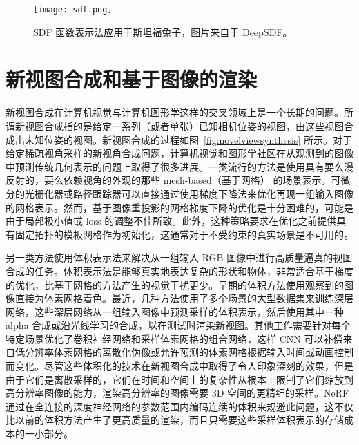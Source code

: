 \begin{figure}[t]
  \centering
  \texttt{[image: sdf.png]}
  \caption{SDF 函数表示法应用于斯坦福兔子，图片来自于 DeepSDF\cite{park2019deepsdf}。}
  \label{fig:sdf}
\end{figure}

\section{新视图合成和基于图像的渲染}
新视图合成在计算机视觉与计算机图形学这样的交叉领域上是一个长期的问题。所谓新视图合成指的是给定一系列（或者单张）已知相机位姿的视图，由这些视图合成出未知位姿的视图。新视图合成的过程如图~\ref{fig:novelviewsynthesis} 所示。对于给定稀疏视角采样的新视角合成问题，计算机视觉和图形学社区在从观测到的图像中预测传统几何表示的问题上取得了很多进展。一类流行的方法是使用具有要么漫反射\cite{Waechter2014Let}的，要么依赖视角\cite{debevec1996modeling, wood2000surface}的外观的那些 mesh-based（基于网格） 的场景表示。可微分的光栅化器\cite{loper2014opendr,chen2019learning,genova2018unsupervised,liu2019soft}或路径跟踪器\cite{li2018differentiable,nimier2019mitsuba}可以直接通过使用梯度下降法来优化再现一组输入图像的网格表示。然而，基于图像重投影的网格梯度下降的优化是十分困难的，可能是由于局部极小值或 loss 的调整不佳所致。此外，这种策略\cite{li2018differentiable}要求在优化之前提供具有固定拓扑的模板网格作为初始化，这通常对于不受约束的真实场景是不可用的。

另一类方法使用体积表示法来解决从一组输入 RGB 图像中进行高质量逼真的视图合成的任务。体积表示法是能够真实地表达复杂的形状和物体，非常适合基于梯度的优化，比基于网格的方法产生的视觉干扰更少。早期的体积方法\cite{kutulakos2000theory,szeliski1998stereo}使用观察到的图像直接为体素网格着色。最近，几种方法\cite{flynn2019deepview,mildenhall2019local,srinivasan2019pushing,zhou2018stereo}使用了多个场景的大型数据集来训练深层网络，这些深层网络从一组输入图像中预测采样的体积表示，然后使用其中一种 alpha 合成\cite{porter1984compositing}或沿光线学习的合成，以在测试时渲染新视图。其他工作需要针对每个特定场景优化了卷积神经网络和采样体素网格的组合网络，这样 CNN 可以补偿来自低分辨率体素网格\cite{sitzmann2019deepvoxels}的离散化伪像或允许预测的体素网格根据输入时间或动画控制而变化。尽管这些体积化的技术在新视图合成中取得了令人印象深刻的效果，但是由于它们是离散采样的，它们在时间和空间上的复杂性从根本上限制了它们缩放到高分辨率图像的能力，渲染高分辨率的图像需要 3D 空间的更精细的采样。NeRF 通过在全连接的深度神经网络的参数范围内编码连续的体积来规避此问题，这不仅比以前的体积方法产生了更高质量的渲染，而且只需要这些采样体积表示的存储成本的一小部分。

